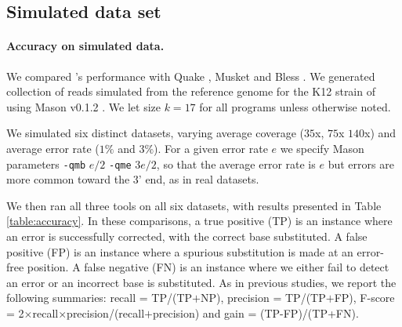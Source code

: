 \documentclass[10pt]{article}
\begin{document}
\subsection*{Simulated data set}

\paragraph{Accuracy on simulated data.} We compared \tool's performance with Quake \cite{kelley2010quake}, Musket\cite{liu2013musket} and Bless \cite{heo2014bless}.  We generated collection of reads simulated from the reference genome for the K12 strain of \ecoli using Mason v0.1.2 \cite{holtgrewe2010mason}.  We let \kmer size $k=17$ for all programs unless otherwise noted.

We simulated six distinct datasets, varying average coverage ($35$x, $75$x $140$x) and average error rate ($1\%$ and $3\%$).  For a given error rate $e$ we specify Mason parameters \verb+-qmb+ $e/2$ \verb+-qme+ $3e/2$, so that the average error rate is $e$ but errors are more common toward the 3' end, as in real datasets.

We then ran all three tools on all six datasets, with results presented in Table \ref{table:accuracy}.  In these comparisons, a true positive (TP) is an instance where an error is successfully corrected, \thatis with the correct base substituted.  A false positive (FP) is an instance where a spurious substitution is made at an error-free position.  A false negative (FN) is an instance where we either fail to detect an error or an incorrect base is substituted.  As in previous studies, we report the following summaries: recall = TP/(TP$+$NP), precision = TP/(TP$+$FP), F-score = 2$\times$recall$\times$precision/(recall$+$precision) and gain = (TP-FP)/(TP+FN).
\end{document}
